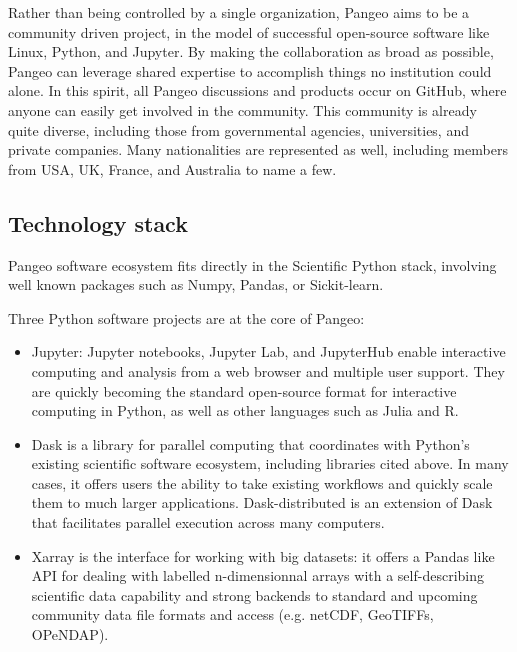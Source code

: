 \documentclass{article}
\begin{document}
Rather than being controlled by a single organization, Pangeo aims to be a community driven project, in the model of successful open-source software like Linux, Python, and Jupyter. By making the collaboration as broad as possible, Pangeo can leverage shared expertise to accomplish things no institution could alone. In this spirit, all Pangeo discussions and products occur on GitHub\cite{b3}, where anyone can easily get involved in the community.
This community is already quite diverse, including those from governmental agencies, universities, and private companies. Many nationalities are represented as well, including members from USA, UK, France, and Australia to name a few.


\subsection{Technology stack}
\label{ssec:techstack}

Pangeo software ecosystem fits directly in the Scientific Python stack, involving well known packages such as Numpy, Pandas, or Sickit-learn.


Three Python software projects are at the core of Pangeo:
\begin{itemize}
\item Jupyter: Jupyter notebooks, Jupyter Lab, and JupyterHub enable interactive computing and analysis from a web browser and multiple user support. They are quickly becoming the standard open-source format for interactive computing in Python, as well as other languages such as Julia and R.
\item Dask is a library for parallel computing that coordinates with Python’s existing scientific software ecosystem, including libraries cited above. In many cases, it offers users the ability to take existing workflows and quickly scale them to much larger applications. Dask-distributed is an extension of Dask that facilitates parallel execution across many computers.
\item Xarray is the interface for working with big datasets: it offers a Pandas like API for dealing with labelled n-dimensionnal arrays with a self-describing scientific data capability and strong backends to standard and upcoming community data file formats and access (e.g. netCDF, GeoTIFFs, OPeNDAP).
\end{itemize}
\end{document}
